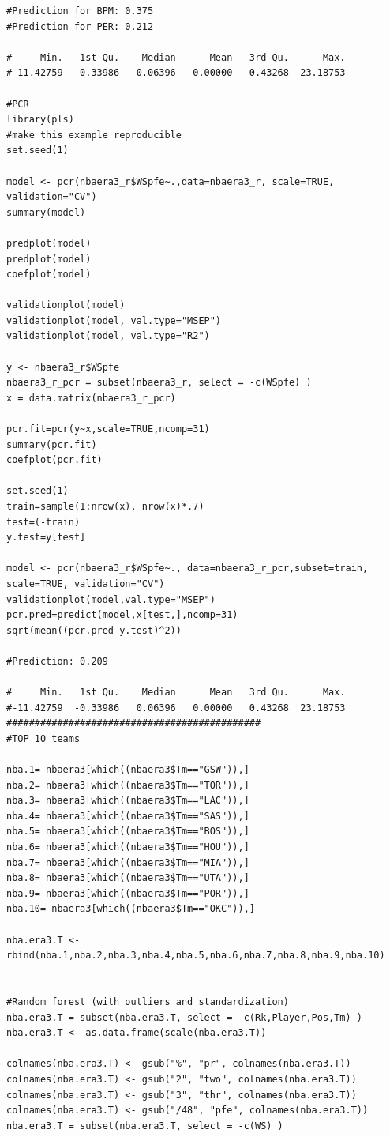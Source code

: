 \documentclass[11pt,letterpaper]{amsart}
\begin{document}
\begin{lstlisting}[breaklines]
#Prediction for BPM: 0.375 
#Prediction for PER: 0.212

#     Min.   1st Qu.    Median      Mean   3rd Qu.      Max. 
#-11.42759  -0.33986   0.06396   0.00000   0.43268  23.18753

#PCR
library(pls)
#make this example reproducible
set.seed(1)

model <- pcr(nbaera3_r$WSpfe~.,data=nbaera3_r, scale=TRUE, validation="CV")
summary(model)

predplot(model)
predplot(model)
coefplot(model)

validationplot(model)
validationplot(model, val.type="MSEP")
validationplot(model, val.type="R2")

y <- nbaera3_r$WSpfe
nbaera3_r_pcr = subset(nbaera3_r, select = -c(WSpfe) )
x = data.matrix(nbaera3_r_pcr)

pcr.fit=pcr(y~x,scale=TRUE,ncomp=31)
summary(pcr.fit)
coefplot(pcr.fit)

set.seed(1)
train=sample(1:nrow(x), nrow(x)*.7)
test=(-train)
y.test=y[test]

model <- pcr(nbaera3_r$WSpfe~., data=nbaera3_r_pcr,subset=train, scale=TRUE, validation="CV")
validationplot(model,val.type="MSEP")
pcr.pred=predict(model,x[test,],ncomp=31)
sqrt(mean((pcr.pred-y.test)^2))

#Prediction: 0.209

#     Min.   1st Qu.    Median      Mean   3rd Qu.      Max. 
#-11.42759  -0.33986   0.06396   0.00000   0.43268  23.18753 
#############################################
#TOP 10 teams

nba.1= nbaera3[which((nbaera3$Tm=="GSW")),]
nba.2= nbaera3[which((nbaera3$Tm=="TOR")),]
nba.3= nbaera3[which((nbaera3$Tm=="LAC")),]
nba.4= nbaera3[which((nbaera3$Tm=="SAS")),]
nba.5= nbaera3[which((nbaera3$Tm=="BOS")),]
nba.6= nbaera3[which((nbaera3$Tm=="HOU")),]
nba.7= nbaera3[which((nbaera3$Tm=="MIA")),]
nba.8= nbaera3[which((nbaera3$Tm=="UTA")),]
nba.9= nbaera3[which((nbaera3$Tm=="POR")),]
nba.10= nbaera3[which((nbaera3$Tm=="OKC")),]

nba.era3.T <- rbind(nba.1,nba.2,nba.3,nba.4,nba.5,nba.6,nba.7,nba.8,nba.9,nba.10)


#Random forest (with outliers and standardization)
nba.era3.T = subset(nba.era3.T, select = -c(Rk,Player,Pos,Tm) )
nba.era3.T <- as.data.frame(scale(nba.era3.T))

colnames(nba.era3.T) <- gsub("%", "pr", colnames(nba.era3.T))
colnames(nba.era3.T) <- gsub("2", "two", colnames(nba.era3.T))
colnames(nba.era3.T) <- gsub("3", "thr", colnames(nba.era3.T))
colnames(nba.era3.T) <- gsub("/48", "pfe", colnames(nba.era3.T))
nba.era3.T = subset(nba.era3.T, select = -c(WS) )


\end{lstlisting}
\end{document}
